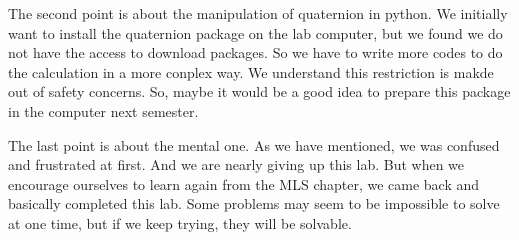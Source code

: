 \documentclass{article}
\begin{document}
\begin{multicols}{2}
The second point is about the manipulation of quaternion in python. We initially want to install the quaternion package on the lab computer, but we found we do not have the access to download packages. So we have to write more codes to do the calculation in a more conplex way. We understand this restriction is makde out of safety concerns. So, maybe it would be a good idea to prepare this package in the computer next semester.

The last point is about the mental one. As we have mentioned, we was confused and frustrated at first. And we are nearly giving up this lab. But when we encourage ourselves to learn again from the MLS chapter, we came back and basically completed this lab. Some problems may seem to be impossible to solve at one time, but if we keep trying, they will be solvable.

\end{multicols}
\end{document}
